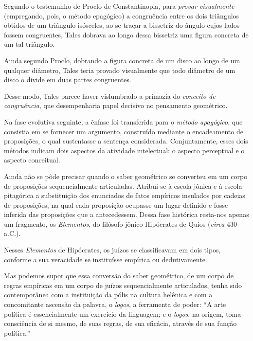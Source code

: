 \documentclass{hipatia}
\begin{document}
Segundo o testemunho de Proclo de Constantinopla, para \emph{provar visualmente} (empregando, pois, o método epagógico) a congruência entre os dois triângulos obtidos de um triângulo isósceles, ao se traçar a bissetriz do ângulo cujos lados fossem congruentes, Tales dobrava ao longo dessa bissetriz uma figura concreta de um tal triângulo. 

Ainda segundo Proclo, dobrando a figura concreta de um disco ao longo de um qualquer diâmetro, Tales teria provado visualmente que todo diâmetro de um disco o divide em duas partes congruentes.  \cite[p. 25]{coolidge1940}\cite[p. 25]{mosterin1984}

Desse modo, Tales parece haver vislumbrado a primazia do \emph{conceito de congruência}, que desempenharia papel decisivo no pensamento geométrico. 

Na fase evolutiva seguinte, a ênfase foi transferida para o \emph{método apagógico}, que consistia em se fornecer um argumento, construído mediante o encadeamento de proposições, o qual sustentasse a sentença considerada. Conjuntamente, esses dois métodos indicam dois aspectos da atividade intelectual: o aspecto perceptual e o aspecto conceitual.  \cite[p. 121]{otte2006}

Ainda não se pôde precisar quando o saber geométrico se converteu em um corpo de proposições sequencialmente articuladas. Atribui-se à escola jônica e à escola pitagórica a substituição dos enunciados de fatos empíricos insulados por cadeias de proposições, na qual cada proposição ocupasse um lugar definido e fosse inferida das proposições que a antecedessem. Dessa fase histórica resta-nos apenas um fragmento, os \emph{Elementos}, do filósofo jônico Hipócrates de Quios (\emph{circa} 430 a.C.).  \cite[p. 120]{kagan1986}\cite[p. 1]{sommerville1958}\cite[p. 39--40]{struik1987}

Nesses \emph{Elementos} de Hipócrates, os juízos se classificavam em dois tipos, conforme a sua veracidade se instituísse empírica ou dedutivamente.  \cite[p. 12]{smogorzhevski1976}

Mas podemos supor que essa conversão do saber geométrico, de um corpo de regras empíricas em um corpo de juízos sequencialmente articulados, tenha sido contemporânea com a instituição da pólis na cultura helênica e com a concomitante ascensão da palavra, o \emph{logos}, a ferramenta de poder: ``A arte política é essencialmente um exercício da linguagem; e o \emph{logos}, na origem, toma consciência de si mesmo, de suas regras, de sua eficácia, através de sua função política.'' \cite[p. 17]{chatelet1994}\cite[p. 35]{vernant1984}
\end{document}
